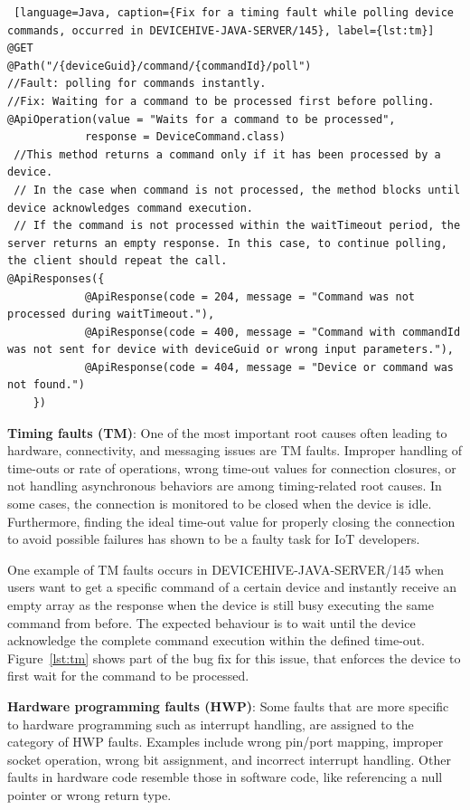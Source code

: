 \begin{lstlisting} [language=Java, caption={Fix for a timing fault while polling device commands, occurred in DEVICEHIVE-JAVA-SERVER/145}, label={lst:tm}] 
@GET
@Path("/{deviceGuid}/command/{commandId}/poll")
//Fault: polling for commands instantly.
//Fix: Waiting for a command to be processed first before polling.
@ApiOperation(value = "Waits for a command to be processed", 
            response = DeviceCommand.class)
 //This method returns a command only if it has been processed by a device. 
 // In the case when command is not processed, the method blocks until device acknowledges command execution.
 // If the command is not processed within the waitTimeout period, the server returns an empty response. In this case, to continue polling, the client should repeat the call.
@ApiResponses({
            @ApiResponse(code = 204, message = "Command was not processed during waitTimeout."),
            @ApiResponse(code = 400, message = "Command with commandId was not sent for device with deviceGuid or wrong input parameters."),
            @ApiResponse(code = 404, message = "Device or command was not found.")
    })
\end{lstlisting}


\textbf{Timing faults (TM)}: One of the most important root causes often leading to hardware, connectivity, and messaging issues are TM faults. Improper handling of time-outs or rate of operations, wrong time-out values for connection closures, or not handling asynchronous behaviors are among timing-related root causes. In some cases, the connection is monitored to be closed when the device is idle. Furthermore, finding the ideal time-out value for properly closing the connection to avoid possible failures has shown to be a faulty task for IoT developers.

One example of TM faults occurs in DEVICEHIVE-JAVA-SERVER/145 when users want to get a specific command of a certain device and instantly receive an empty array as the response when the device is still busy executing the same command from before. The expected behaviour is to wait until the device acknowledge the complete command execution within the defined time-out. Figure~\autoref{lst:tm} shows part of the bug fix for this issue, that enforces the device to first wait for the command to be processed.



\textbf{Hardware programming faults (HWP)}: Some faults that are more specific to hardware programming such as interrupt handling, are assigned to the category of HWP faults. Examples include wrong pin/port mapping, improper socket operation, wrong bit assignment, and incorrect interrupt handling. Other faults in hardware code resemble those in software code, like referencing a null pointer or wrong return type.



